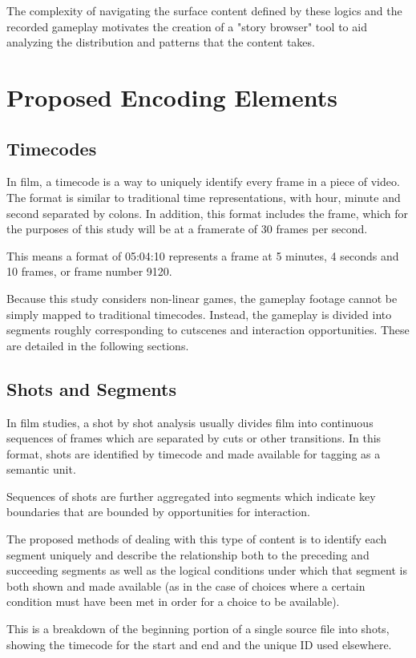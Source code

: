 \documentclass{llncs}
\begin{document}
The complexity of navigating the surface content defined by these
logics and the recorded gameplay motivates the creation of a "story
browser" tool to aid analyzing the distribution and patterns that the
content takes.
\section*{Proposed Encoding Elements}
\label{sec:orgheadline14}
\subsection*{Timecodes}
\label{sec:orgheadline10}
In film, a timecode is a way to uniquely identify every frame in a
piece of video. The format is similar to traditional time
representations, with hour, minute and second separated by colons. In
addition, this format includes the frame, which for the purposes of
this study will be at a framerate of 30 frames per second.

This means a format of 05:04:10 represents a frame at 5 minutes, 4
seconds and 10 frames, or frame number 9120.

Because this study considers non-linear games, the gameplay footage
cannot be simply mapped to traditional timecodes. Instead, the
gameplay is divided into segments roughly corresponding to cutscenes
and interaction opportunities. These are detailed in the following
sections.

\subsection*{Shots and Segments}
\label{sec:orgheadline11}
In film studies, a shot by shot analysis usually divides film into
continuous sequences of frames which are separated by cuts or other
transitions. In this format, shots are identified by timecode and made
available for tagging as a semantic unit.

Sequences of shots are further aggregated into segments which indicate
key boundaries that are bounded by opportunities for interaction.

The proposed methods of dealing with this type of content is to
identify each segment uniquely and describe the relationship both to
the preceding and succeeding segments as well as the logical
conditions under which that segment is both shown and made available
(as in the case of choices where a certain condition must have been
met in order for a choice to be available).

This is a breakdown of the beginning portion of a single source file
into shots, showing the timecode for the start and end and the unique
ID used elsewhere.
\end{document}
